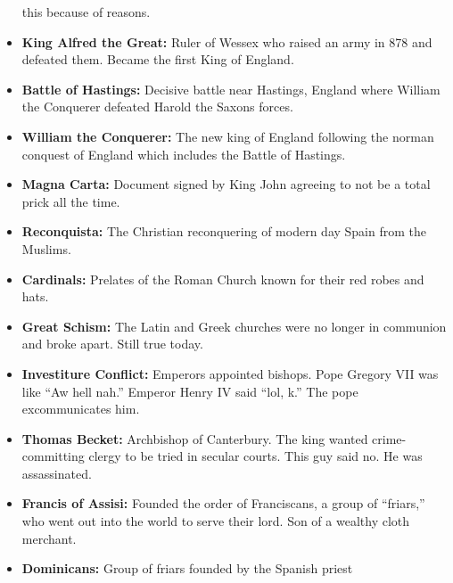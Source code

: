 \documentclass[crop=false,class=book]{standalone}
\begin{document}
\begin{itemize}[noitemsep]
                    this because of reasons.
                \item \textbf{King Alfred the Great:}
                    Ruler of Wessex who raised an army in 878 and
                    defeated them. Became the first King of England.
                \item \textbf{Battle of Hastings:}
                    Decisive battle near Hastings, England where
                    William the Conquerer defeated Harold the Saxons
                    forces.
                \item \textbf{William the Conquerer:}
                    The new king of England following the norman
                    conquest of England which includes the Battle of
                    Hastings.
                \item \textbf{Magna Carta:}
                    Document signed by King John agreeing to not be
                    a total prick all the time.
                \item \textbf{Reconquista:}
                    The Christian reconquering of modern day
                    Spain from the Muslims.
                \item \textbf{Cardinals:}
                    Prelates of the Roman Church known for their
                    red robes and hats.
                \item \textbf{Great Schism:}
                    The Latin and Greek churches were no longer in
                    communion and broke apart. Still true today.
                \item \textbf{Investiture Conflict:}
                    Emperors appointed bishops. Pope Gregory VII was
                    like ``Aw hell nah.''
                    Emperor Henry IV said ``lol, k.''
                    The pope excommunicates him. 
                \item \textbf{Thomas Becket:}
                    Archbishop of Canterbury. The king wanted
                    crime-committing clergy to be tried in secular
                    courts. This guy said no. He was assassinated.
                \item \textbf{Francis of Assisi:}
                    Founded the order of Franciscans, a group of
                    “friars,” who went out into the world to serve
                    their lord. Son of a wealthy cloth merchant.
                \item \textbf{Dominicans:}
                    Group of friars founded by the Spanish priest

\end{itemize}
\end{document}
